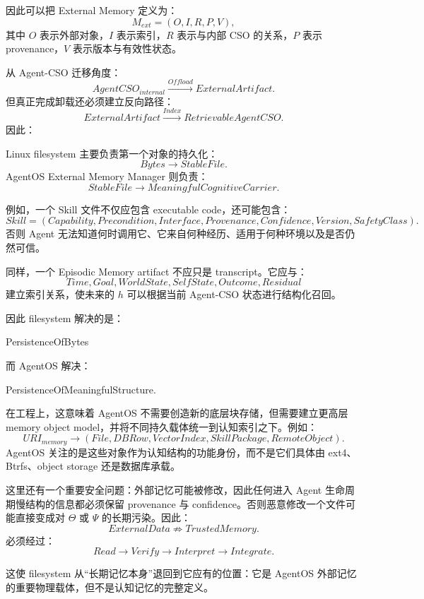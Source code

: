 因此可以把 External Memory 定义为：
\[
M_{ext}
=
(
O,
I,
R,
P,
V
),
\]
其中 $O$ 表示外部对象，$I$ 表示索引，$R$ 表示与内部 CSO 的关系，$P$ 表示 provenance，$V$ 表示版本与有效性状态。

从 Agent-CSO 迁移角度：
\[
AgentCSO_{internal}
\xrightarrow{Offload}
ExternalArtifact.
\]
但真正完成卸载还必须建立反向路径：
\[
ExternalArtifact
\xrightarrow{Index}
RetrievableAgentCSO.
\]
因此：
\begin{statementbox}
\centering
{}
\end{statementbox}

Linux filesystem 主要负责第一个对象的持久化：
\[
Bytes\rightarrow StableFile.
\]
AgentOS External Memory Manager 则负责：
\[
StableFile
\rightarrow
MeaningfulCognitiveCarrier.
\]

例如，一个 Skill 文件不仅应包含 executable code，还可能包含：
\[
Skill=
(
Capability,
Precondition,
Interface,
Provenance,
Confidence,
Version,
SafetyClass
).
\]
否则 Agent 无法知道何时调用它、它来自何种经历、适用于何种环境以及是否仍然可信。

同样，一个 Episodic Memory artifact 不应只是 transcript。它应与：
\[
Time,
Goal,
WorldState,
SelfState,
Outcome,
Residual
\]
建立索引关系，使未来的 $h$ 可以根据当前 Agent-CSO 状态进行结构化召回。

因此 filesystem 解决的是：
\begin{statementbox}
PersistenceOfBytes
\end{statementbox}
而 AgentOS 解决：
\begin{statementbox}
PersistenceOfMeaningfulStructure.
\end{statementbox}

在工程上，这意味着 AgentOS 不需要创造新的底层块存储，但需要建立更高层 memory object model，并将不同持久载体统一到认知索引之下。例如：
\[
URI_{memory}
\rightarrow
(
File,
DBRow,
VectorIndex,
SkillPackage,
RemoteObject
).
\]
AgentOS 关注的是这些对象作为认知结构的功能身份，而不是它们具体由 ext4、Btrfs、object storage 还是数据库承载。

这里还有一个重要安全问题：外部记忆可能被修改，因此任何进入 Agent 生命周期慢结构的信息都必须保留 provenance 与 confidence。否则恶意修改一个文件可能直接变成对 $\Theta$ 或 $\Psi$ 的长期污染。因此：
\[
ExternalData
\not\Rightarrow
TrustedMemory.
\]
必须经过：
\[
Read
\rightarrow
Verify
\rightarrow
Interpret
\rightarrow
Integrate.
\]

这使 filesystem 从“长期记忆本身”退回到它应有的位置：它是 AgentOS 外部记忆的重要物理载体，但不是认知记忆的完整定义。

